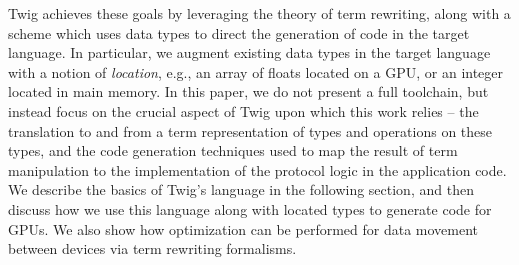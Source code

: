 Twig achieves these goals by leveraging the theory of term
rewriting\cite{baader98rewriting}, along with a scheme which uses data types to
direct the generation of code in the target language. In particular, we augment
existing data types in the target language with a notion of \emph{location},
e.g., an array of floats located on a GPU, or an integer located in main memory.
In this paper, we do not present a full toolchain, but instead focus on the
crucial aspect of Twig upon which this work relies -- the translation to and
from a term representation of types and operations on these types, and the code
generation techniques used to map the result of term manipulation to the
implementation of the protocol logic in the application code. We describe the
basics of Twig's language in the following section, and then discuss how we use
this language along with located types to generate code for GPUs. We also show
how optimization can be performed for data movement between devices via term
rewriting formalisms.
